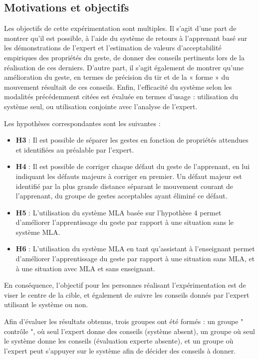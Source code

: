 \subsection{Motivations et objectifs}
Les objectifs de cette expérimentation sont multiples. Il s'agit d'une part de montrer qu'il est possible, à l'aide du système de retours à l'apprenant basé sur les démonstrations de l'expert et l'estimation de valeurs d'acceptabilité empiriques des propriétés du geste, de donner des conseils pertinents lors de la réalisation de ces derniers. D'autre part, il s'agit également de montrer qu'une amélioration du geste, en termes de précision du tir et de la « forme » du mouvement résultait de ces conseils. Enfin, l'efficacité du système selon les modalités précédemment citées est évaluée en termes d'usage : utilisation du système seul, ou utilisation conjointe avec l'analyse de l'expert.

Les hypothèses correspondantes sont les suivantes :
\begin{itemize}
    \item \textbf{H3} : Il est possible de séparer les gestes en fonction de propriétés attendues et identifiées au préalable par l'expert.
	\item \textbf{H4} : Il est possible de corriger chaque défaut du geste de l'apprenant, en lui indiquant les défauts majeurs à corriger en premier. Un défaut majeur est identifié par la plus grande distance séparant le mouvement courant de l'apprenant, du groupe de gestes acceptables ayant éliminé ce défaut.
	\item \textbf{H5} : L'utilisation du système MLA basée sur l'hypothèse 4 permet d'améliorer l'apprentissage du geste par rapport à une situation sans le système MLA.
	\item \textbf{H6} : L'utilisation du système MLA en tant qu'assistant à l'enseignant permet d'améliorer l'apprentissage du geste par rapport à une situation sans MLA, et à une situation avec MLA et sans enseignant.
\end{itemize}


En conséquence, l'objectif pour les personnes réalisant l'expérimentation est de viser le centre de la cible, et également de suivre les conseils donnés par l'expert utilisant le système ou non.

Afin d'évaluer les résultats obtenus, trois groupes ont été formés : un groupe " contrôle ", où seul l'expert donne des conseils (système absent), un groupe où seul le système donne les conseils (évaluation experte absente), et un groupe où l'expert peut s'appuyer sur le système afin de décider des conseils à donner.

